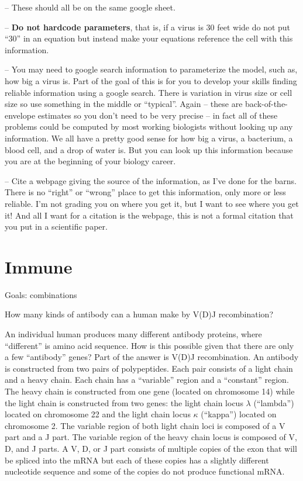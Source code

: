 \documentclass[]{book}
\begin{document}
-- These should all be on the same google sheet.

-- \textbf{Do not hardcode parameters}, that is, if a virus is 30 feet
wide do not put ``30'' in an equation but instead make your equations
reference the cell with this information.

-- You may need to google search information to parameterize the model,
such as, how big a virus is. Part of the goal of this is for you to
develop your skills finding reliable information using a google search.
There is variation in virus size or cell size so use something in the
middle or ``typical''. Again -- these are back-of-the-envelope estimates
so you don't need to be very precise -- in fact all of these problems
could be computed by most working biologists without looking up any
information. We all have a pretty good sense for how big a virus, a
bacterium, a blood cell, and a drop of water is. But you can look up
this information because you are at the beginning of your biology
career.

-- Cite a webpage giving the source of the information, as I've done for
the barns. There is no ``right'' or ``wrong'' place to get this
information, only more or less reliable. I'm not grading you on where
you get it, but I want to see where you get it! And all I want for a
citation is the webpage, this is not a formal citation that you put in a
scientific paper.

\chapter{Immune}\label{immune}

Goals: combinations

How many kinds of antibody can a human make by V(D)J recombination?

An individual human produces many different antibody proteins, where
``different'' is amino acid sequence. How is this possible given that
there are only a few ``antibody'' genes? Part of the answer is V(D)J
recombination. An antibody is constructed from two pairs of
polypeptides. Each pair consists of a light chain and a heavy chain.
Each chain has a ``variable'' region and a ``constant'' region. The
heavy chain is constructed from one gene (located on chromosome 14)
while the light chain is constructed from two genes: the light chain
locus \(\lambda\) (``lambda'') located on chromosome 22 and the light
chain locus \(\kappa\) (``kappa'') located on chromosome 2. The variable
region of both light chain loci is composed of a V part and a J part.
The variable region of the heavy chain locus is composed of V, D, and J
parts. A V, D, or J part consists of multiple copies of the exon that
will be spliced into the mRNA but each of these copies has a slightly
different nucleotide sequence and some of the copies do not produce
functional mRNA.
\end{document}
